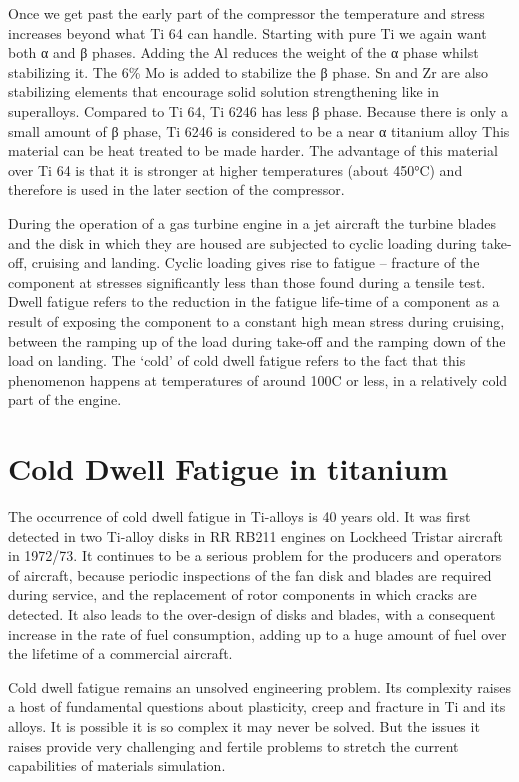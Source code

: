 Once we get past the early part of the compressor the temperature and stress increases beyond what Ti 64 can handle.  Starting with pure Ti we again want both α and β phases.  Adding the Al reduces the weight of the α phase whilst stabilizing it.  The 6\% Mo is added to stabilize the β phase.  Sn and Zr are also stabilizing elements that encourage solid solution strengthening like in superalloys.  Compared to Ti 64, Ti 6246 has less β phase.  Because there is only a small amount of β phase, Ti 6246 is considered to be a near α titanium alloy  This material can be heat treated to be made harder.  The advantage of this material over Ti 64 is that it is stronger at higher temperatures (about 450°C) and therefore is used in the later section of the compressor.

During the operation of a gas turbine engine in a jet aircraft the turbine blades and the disk in which they are housed are subjected to cyclic loading during take-off, cruising and landing. Cyclic loading gives rise to fatigue – fracture of the component at stresses significantly less than those found during a tensile test. Dwell fatigue refers to the reduction in the fatigue life-time of a component as a result of exposing the component to a constant high mean stress during cruising, between the ramping up of the load during take-off and the ramping down of the load on landing. The ‘cold’ of cold dwell fatigue refers to the fact that this phenomenon happens at temperatures of around 100C or less, in a relatively cold part of the engine.


\iffalse
\section{Cold Dwell Fatigue in titanium} 
\citep{cecam}
The occurrence of cold dwell fatigue in Ti-alloys is 40 years old. It was first detected in two Ti-alloy disks in RR RB211 engines on Lockheed Tristar aircraft in 1972/73. It continues to be a serious problem for the producers and operators of aircraft, because periodic inspections of the fan disk and blades are required during service, and the replacement of rotor components in which cracks are detected. It also leads to the over-design of disks and blades, with a consequent increase in the rate of fuel consumption, adding up to a huge amount of fuel over the lifetime of a commercial aircraft.

Cold dwell fatigue remains an unsolved engineering problem. Its complexity raises a host of fundamental questions about plasticity, creep and fracture in Ti and its alloys. It is possible it is so complex it may never be solved. But the issues it raises provide very challenging and fertile problems to stretch the current capabilities of materials simulation.

